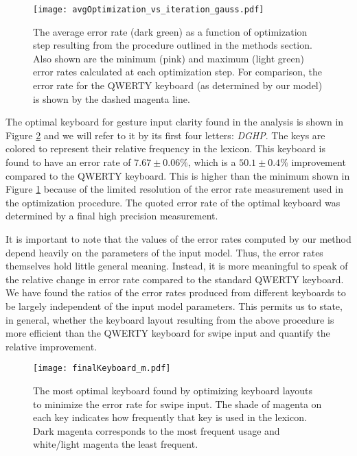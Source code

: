 \documentclass[final,1p,times,authoryear]{elsarticle}
\begin{document}
\begin{figure}[t]
\begin{centering}
\texttt{[image: avgOptimization\_vs\_iteration\_gauss.pdf]}
\par\end{centering}
\smallskip{}
\protect\caption{The average error rate (dark green) as a function of optimization
step resulting from the procedure outlined in the methods section.
Also shown are the minimum (pink) and maximum (light green) error
rates calculated at each optimization step. For comparison, the error
rate for the QWERTY keyboard (as determined by our model) is shown
by the dashed magenta line.\label{fig:The-Average-error}}
\end{figure}

The optimal keyboard for gesture input clarity found in the analysis is shown in Figure \ref{fig:The-most-optimal}
and we will refer to it by its first four letters: \textit{DGHP}.
The keys are colored to represent their relative frequency in the
lexicon. This keyboard is found to have an error rate of $7.67 \pm 0.06\%$,
which is a $50.1 \pm 0.4\%$ improvement compared to the QWERTY keyboard.
This is higher than the minimum shown in Figure \ref{fig:The-Average-error}
because of the limited resolution of the error rate measurement used
in the optimization procedure. The quoted error rate of the optimal
keyboard was determined by a final high precision measurement.

It is important to note that the values of the error rates computed by
our method depend heavily on the parameters of the input model. Thus,
the error rates themselves hold little general meaning. Instead, it
is more meaningful to speak of the relative change in error rate compared
to the standard QWERTY keyboard. We have found the ratios of the error
rates produced from different keyboards to be largely independent
of the input model parameters. This permits us to state, in general,
whether the keyboard layout resulting from the above procedure is
more efficient than the QWERTY keyboard for swipe input and quantify
the relative improvement.

\begin{figure}[tbh]
\begin{centering}
\texttt{[image: finalKeyboard\_m.pdf]}
\par\end{centering}
\medskip{}
\protect\caption{The most optimal keyboard found by optimizing keyboard layouts to
minimize the error rate for swipe input. The shade of magenta on each
key indicates how frequently that key is used in the lexicon.
Dark magenta corresponds to the most frequent usage and white/light
magenta the least frequent. \label{fig:The-most-optimal}}
\end{figure}
\end{document}
